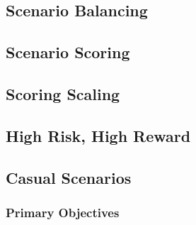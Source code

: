 \subsection{Scenario Balancing}



\subsection{Scenario Scoring}
\label{subsec:scenario_scoring}



\subsection{Scoring Scaling}



\subsection{High Risk, High Reward}



\subsection{Casual Scenarios}



\subsubsection{Primary Objectives}




